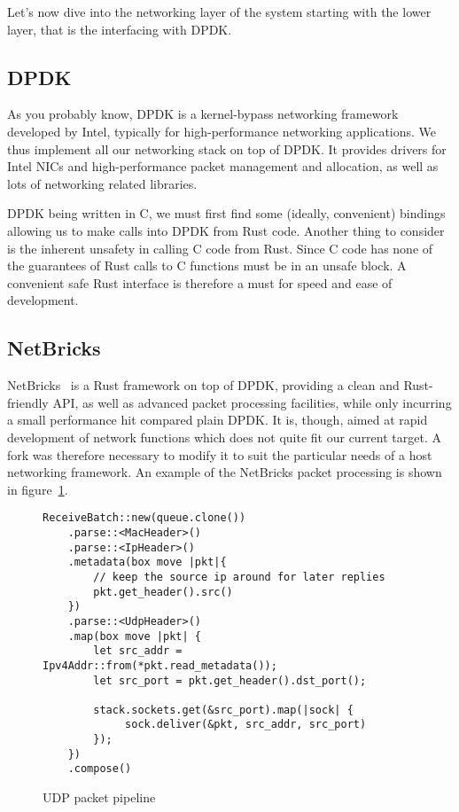 \documentclass[11pt]{book}
\begin{document}
Let's now dive into the networking layer of the system starting with
the lower layer, that is the interfacing with DPDK.

\subsection{DPDK} 

As you probably know, DPDK is a kernel-bypass networking framework
developed by Intel, typically for high-performance networking
applications. We thus implement all our networking stack on top of
DPDK. It provides drivers for Intel NICs and high-performance packet
management and allocation, as well as lots of networking related
libraries.

DPDK being written in C, we must first find some (ideally, convenient)
bindings allowing us to make calls into DPDK from Rust code. Another
thing to consider is the inherent unsafety in calling C code from
Rust. Since C code has none of the guarantees of Rust calls to C
functions must be in an unsafe block. A convenient safe Rust interface
is therefore a must for speed and ease of development.


\subsection{NetBricks}

NetBricks~\cite{netbricks} is a Rust framework on top of DPDK,
providing a clean and Rust-friendly API, as well as advanced packet
processing facilities, while only incurring a small performance hit
compared plain DPDK. It is, though, aimed at rapid development of
network functions which does not quite fit our current target. A fork
was therefore necessary to modify it to suit the particular needs of a
host networking framework. An example of the NetBricks packet
processing is shown in figure~\ref{code:udp-pipeline}.

\begin{figure}[htb!]
\begin{lstlisting}
ReceiveBatch::new(queue.clone())
    .parse::<MacHeader>()
    .parse::<IpHeader>()
    .metadata(box move |pkt|{
        // keep the source ip around for later replies
        pkt.get_header().src()
    })
    .parse::<UdpHeader>()
    .map(box move |pkt| {
        let src_addr = Ipv4Addr::from(*pkt.read_metadata());
        let src_port = pkt.get_header().dst_port();

        stack.sockets.get(&src_port).map(|sock| {
             sock.deliver(&pkt, src_addr, src_port)
        });
    })
    .compose()
\end{lstlisting}

  \label{code:udp-pipeline}
  \caption{UDP packet pipeline}
\end{figure}
\end{document}
